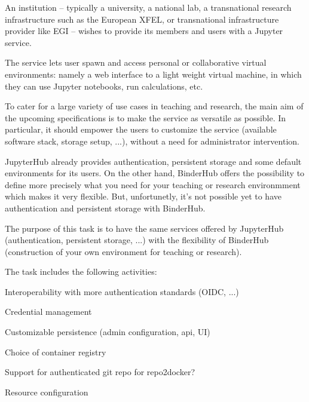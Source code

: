 \begin{task}[
  title=JupyterHub / BinderHub convergence,
  id=jh-bh-conv,
  lead=EP,
  PM=12,
  wphases={0-48},
  partners={EP,WTT}]

  An institution – typically a university, a national lab, a transnational
  research infrastructure such as the European XFEL, or transnational 
  infrastructure provider like EGI – wishes to provide its members and 
  users with a Jupyter service.

  The service lets user spawn and access personal or collaborative virtual
  environments: namely a web interface to a light weight virtual machine,
  in which they can use Jupyter notebooks, run calculations, etc.

  To cater for a large variety of use cases in teaching and research,
  the main aim of the upcoming specifications is to make the service as
  versatile as possible. In particular, it should empower the users to 
  customize the service (available software stack, storage setup, ...),
  without a need for administrator intervention.

  JupyterHub already provides authentication, persistent storage and some
  default environments for its users. On the other hand, BinderHub offers
  the possibility to define more precisely what you need for your teaching
  or research environmment which makes it very flexible. But, unfortunetly,
  it's not possible yet to have authentication and persistent storage with
  BinderHub.

  The purpose of this task is to have the same services offered by JupyterHub
  (authentication, persistent storage, ...) with the flexibility of BinderHub
  (construction of your own environment for teaching or research).

  The task includes the following activities:
  \begin{compactitem}
  \item Interoperability with more authentication standards (OIDC,
    ...)
  \item Credential management
  \item Customizable persistence (admin configuration, api, UI)
  \item Choice of container registry
  \item Support for authenticated git repo for repo2docker?
  \item Resource configuration
  \end{compactitem}

\end{task}
